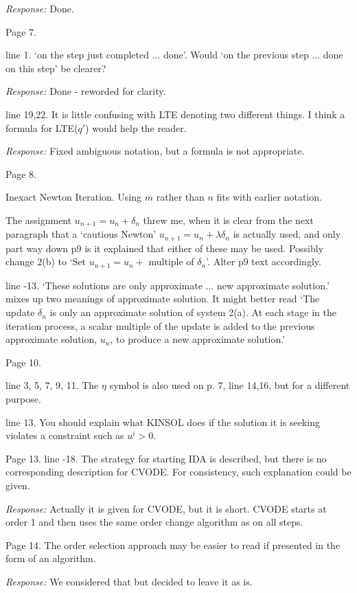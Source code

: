 \documentclass[12pt]{letter}
\begin{document}
{\em Response:} Done.
 
Page 7.  

line 1. `on the step just completed ... done'. Would `on the previous step ... 
done on this step' be clearer?  

{\em Response:} Done - reworded for clarity.

line 19,22. It is little confusing with LTE denoting two different things. 
I think a formula for LTE($q'$) would help the reader. 

{\em Response:} Fixed ambiguous notation, but a formula is not appropriate.
 
Page 8.

Inexact Newton Iteration. Using $m$ rather than $n$ fits with earlier
notation.

The assignment $u_{n+1} = u_n + \delta_n$ threw me, when it is clear
from the next paragraph that a `cautious Newton' $u_{n+1} = u_n +
\lambda\delta_n$ is actually used, and only part way down p9 is it
explained that either of these may be used. Possibly change 2(b) to
`Set $u_{n+1} = u_n + $ multiple of $\delta_n$'. Alter p9 text accordingly.

line -13. `These solutions are only approximate ... new approximate
solution.'  mixes up two meanings of approximate solution. It might
better read `The update $\delta_n$ is only an approximate solution of
system 2(a). At each stage in the iteration process, a scalar multiple
of the update is added to the previous approximate solution, $u_n$, to
produce a new approximate solution.'
 
Page 10.  

line 3, 5, 7, 9, 11. The $\eta$ symbol is also used on p. 7, line
14,16, but for a different purpose.

line 13. You should explain what KINSOL does if the solution it is
seeking violates a constraint such as $u^i > 0$.
 
Page 13.
line -18. The strategy for starting IDA is described, but there is no
corresponding description for CVODE. For consistency, such explanation
could be given.

{\em Response:} Actually it is given for CVODE, but it is short.
CVODE starts at order 1 and then uses the same order change algorithm
as on all steps.

Page 14. The order selection approach may be easier to read if
presented in the form of an algorithm.

{\em Response:} We considered that but decided to leave it as is.
 
\end{document}
